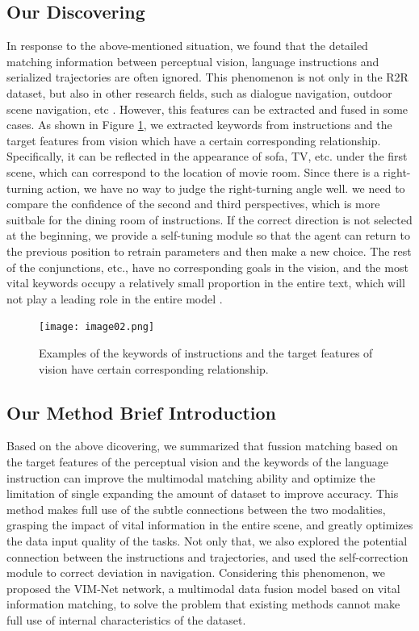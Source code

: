 \subsection{Our Discovering}

In response to the above-mentioned situation, we found that the detailed matching information between perceptual vision, language instructions and serialized trajectories are often ignored. This phenomenon is not only in the R2R dataset, but also in other research fields, such as dialogue navigation, outdoor scene navigation, etc \cite{nguyen2019help,yan2019cross,chen2019touchdown}. However, this features can be extracted and fused in some cases. As shown in Figure \ref{image02}, we extracted keywords from instructions and the target features from vision which have a certain corresponding relationship. Specifically, it can be reflected in the appearance of sofa, TV, etc. under the first scene, which can correspond to the location of movie room. Since there is a right-turning action, we have no way to judge the right-turning angle well. we need to compare the confidence of the second and third perspectives, which is more suitbale for the dining room of instructions. If the correct direction is not selected at the beginning, we provide a self-tuning module so that the agent can return to the previous position to retrain parameters and then make a new choice. The rest of the conjunctions, etc., have no corresponding goals in the vision, and the most vital keywords occupy a relatively small proportion in the entire text, which will not play a leading role in the entire model \cite{hao2020towards}.
\begin{figure}[h]
	\centering
	\texttt{[image: image02.png]}
	\caption{Examples of the keywords of instructions and the target features of vision  have certain corresponding relationship.}
	\label{image02}
	\vspace{-2em}
\end{figure}

\subsection{Our Method Brief Introduction}

Based on the above dicovering, we summarized that fussion matching based on the target features of the perceptual vision and the keywords of the language instruction can improve the multimodal matching ability and optimize the limitation of single expanding the amount of dataset to improve accuracy. This method makes full use of the subtle connections between the two modalities, grasping the impact of vital information in the entire scene, and greatly optimizes the data input quality of the tasks. Not only that, we also explored the potential connection between the instructions and trajectories, and used the self-correction module to correct deviation in navigation. Considering this phenomenon, we proposed the VIM-Net network, a multimodal data fusion model based on vital information matching, to solve the problem that existing methods cannot make full use of internal characteristics of the dataset.

